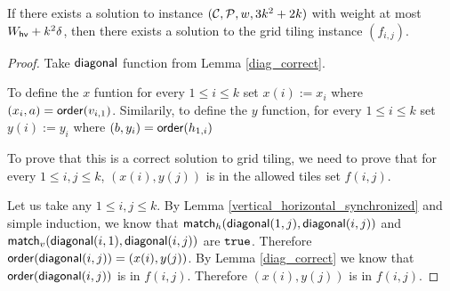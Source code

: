 \begin{lemma}
\label{grid_tiling_exists}
	If there exists a solution to instance $(\mathcal{C}, \mathcal{P}, w, 3k^2+2k)$
	with weight at most $W_{\mathsf{hv}}+k^2\delta$,
	then there exists a solution to the grid tiling instance $(f_{i,j})$.
\end{lemma}

\begin{proof}
Take $\mathsf{diagonal}$ function from Lemma \ref{diag_correct}.

To define the $x$ funtion 
for every $1 \le i \le k$ set $x(i) := x_i$
where $(x_i, a) = \mathsf{order}(v_{i,1})$.
Similarily, to define the $y$ function,
for every $1 \le i \le k$ set $y(i) := y_i$
where $(b, y_i) = \mathsf{order}(h_{1,i})$

To prove that this is a correct solution to grid tiling,
we need to prove that 
for every $1 \le i,j \le k$, $(x(i), y(j))$ is in
the allowed tiles set $f(i,j)$.

Let us take any $1 \le i,j \le k$.
By Lemma \ref{vertical_horizontal_synchronized}
and simple induction,
we know that $\mathsf{match}_h(\mathsf{diagonal}(1, j),\mathsf{diagonal}(i, j))$ and
$\mathsf{match}_v(\mathsf{diagonal}(i, 1),\mathsf{diagonal}(i, j))$ are $\texttt{true}$.
Therefore $\mathsf{order}(\mathsf{diagonal}(i,j)) = (x(i), y(j))$.
By Lemma \ref{diag_correct} we know that 
$\mathsf{order}(\mathsf{diagonal}(i,j))$ is in $f(i,j)$.
Therefore 
$(x(i), y(j))$
is in $f(i,j)$.
\end{proof}

